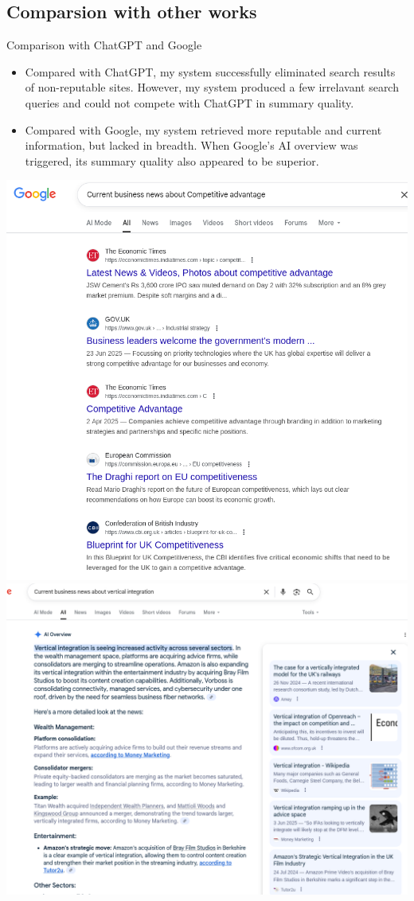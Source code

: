\documentclass{beamer}
\begin{document}
\subsection{Comparsion with other works}

\begin{frame}{Comparison with ChatGPT and Google}
\begin{itemize}
	\item Compared with ChatGPT, my system successfully eliminated search
		results of non-reputable sites. However, my system produced a few
		irrelavant search queries and could not compete with ChatGPT in summary
		quality. 
	\item Compared with Google, my system retrieved more reputable and current
		information, but lacked in breadth. When Google's AI overview was
		triggered, its summary quality also appeared to be superior.
\end{itemize}
\begin{center}
	\includegraphics[height=.4\textheight]{../../deliverables/thesis/res/google_res1.png}
	\includegraphics[height=.4\textheight]{../../deliverables/thesis/res/google_res2.png}

\end{center}
\end{frame}
\end{document}
